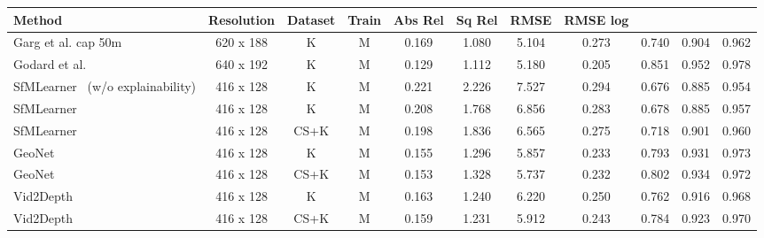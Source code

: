 \documentclass[letterpaper, 10 pt, conference]{ieeeconf}  \IEEEoverridecommandlockouts
\begin{document}
\begin{table*}[h]
\centering
{
\small
\setlength{\tabcolsep}{0.3em}
\begin{tabular}{lcccccccccc}
\toprule
\textbf{Method} &
Resolution & 
Dataset &
Train &
Abs Rel &
Sq Rel &
RMSE &
RMSE log &
 &
 &
\vspace{0.5mm}\\
\midrule
Garg et al.\cite{garg2016unsupervised} cap 50m & 620 x 188 & K & M & 0.169 & 1.080 &
5.104 & 0.273 & 0.740 & 0.904 & 0.962\\

Godard et al.~\cite{godard2018digging} & 640 x 192 & K & M & 0.129 & 1.112 & 5.180 & 0.205 & 0.851 & 0.952 & 0.978\\

SfMLearner~\cite{zhou2017unsupervised} (w/o explainability) & 416 x 128 & K & M
& 
0.221 & 2.226 & 7.527 & 0.294 & 0.676 & 0.885 & 0.954\\
SfMLearner~\cite{zhou2017unsupervised} & 416 x 128 & K & M & 0.208 & 1.768 & 6.856 & 0.283 & 0.678 & 0.885 & 0.957\\
SfMLearner~\cite{zhou2017unsupervised} & 416 x 128 & CS+K & M & 0.198 & 1.836 & 6.565 & 0.275 & 0.718 & 0.901 & 0.960\\
GeoNet~\cite{yin2018geonet} & 416 x 128 & K & M & 0.155 & 1.296 & 5.857 & 0.233 & 0.793 & 0.931 & 0.973 \\
GeoNet~\cite{yin2018geonet} & 416 x 128 & CS+K & M & 0.153 & 1.328 & 5.737 & 0.232 & 0.802 & 0.934 & 0.972 \\
Vid2Depth~\cite{mahjourian2018unsupervised} & 416 x 128 & K & M & 0.163 & 1.240 & 6.220 & 0.250 & 0.762 & 0.916 & 0.968 \\
Vid2Depth~\cite{mahjourian2018unsupervised} & 416 x 128 & CS+K & M & 0.159 & 1.231 & 5.912 & 0.243 & 0.784 & 0.923 & 0.970 \\



\end{tabular}}
\end{table*}
\end{document}
